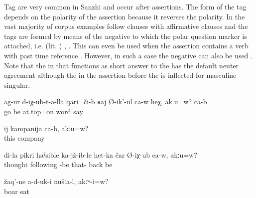 Tag  are very common in Sanzhi and occur after assertions. The form of the tag depends on the polarity of the assertion because it reverses the polarity. In the vast majority of corpus examples  follow clauses with affirmative clauses and the tags are formed by means of the negative   to which the polar question marker  is attached, i.e.  (lit. ) , . This  can even be used when the assertion contains a verb with past time reference . However, in such a case the negative   can also be used . Note that the  in  that functions as short answer to the  has the default neuter agreement although the  in the assertion before the  is inflected for masculine singular.
%
\begin{exe}
	\ex	\label{ex:About what had happened he is talking, right? Yes}
	\gll	ag-ur	d-iχ-ub-t-a-lla	qari=či-b 	ʁaj	Ø-ik'-ul	ca-w	heχ,	akːu=w?	ca-b\\
		go	be	at.top=on	word	say				\\
	\glt	{}

	\ex	\label{ex:This is the company (group of friends), right}
	\gll	ij	kampanija	ca-b,	akːu=w?\\
		this	company		\\
	\glt	{}

	\ex	\label{ex:‎In my opinion, he was imprisoned and then came back from there, right}
	\gll	di-la	pikri	ħaˁsible	ka-jž-ib-le	het-ka	čar	Ø-iχ-ub	ca-w,	akːu=w?\\
			thought	following	-be	that-	back be		\\
	\glt	{}

	\ex	\label{ex:‎We did not eat boars, right}
	\gll	žaq'-ne	a-d-uk-i	nušːa-l,	akːʷ-i=w?\\
		boar	eat			\\
	\glt	{}
\end{exe}

